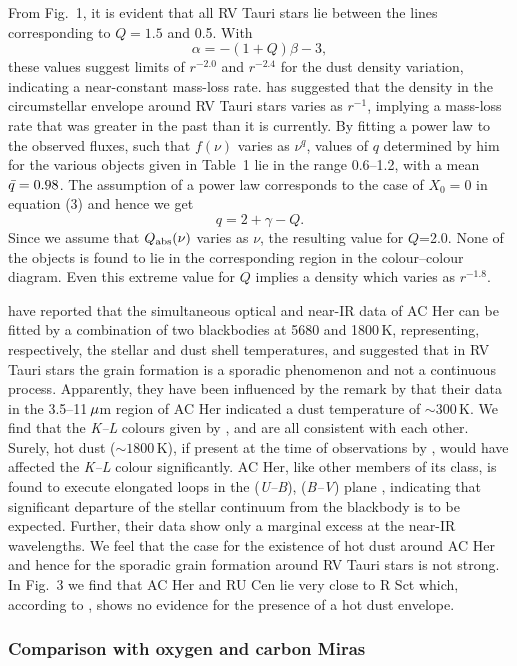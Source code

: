 \documentclass[useAMS,usenatbib]{mn2e}
\begin{document}
From Fig.~1, it is evident that all RV Tauri stars lie between the
lines corresponding to $Q=1.5$ and 0.5. With
 \[
  \alpha=-(1+Q)\beta-3,
 \]
 these values suggest limits of $r^{-2.0}$ and $r^{-2.4}$ for the
dust density variation, indicating a near-constant mass-loss rate.
\citet{b12} has suggested that the density in the circumstellar
envelope around RV Tauri stars varies as $r^{-1}$, implying a
mass-loss rate that was greater in the past than it is currently.
By fitting a power law to the observed fluxes, such that $f(\nu)$
varies as $\nu^q$, values of $q$ determined by him for the various
objects given in Table~1 lie in the range 0.6--1.2, with a mean
$\skew5\bar q=0.98$. The assumption of a power law corresponds to
the case of $X_0=0$ in equation (3) and hence we get
 \[
  q=2+\gamma -Q.
 \]
Since we assume that $Q_{{\mathrm{abs}}}(\nu)$ varies as $\nu$, the
resulting value for $Q$=2.0. None of the objects is found to lie in the
corresponding region in the colour--colour diagram. Even this extreme
value for $Q$ implies a density which varies as $r^{-1.8}$.

\citet{b9} have reported that the simultaneous optical and near-IR
data of AC Her can be fitted by a combination of two blackbodies
at 5680 and 1800\,K, representing, respectively, the stellar and
dust shell temperatures, and suggested that in RV Tauri stars the
grain formation is a sporadic phenomenon and not a continuous
process. Apparently, they have been influenced by the remark by
\citet{b7} that their data in the 3.5--11$\,\mu$m region of AC
Her indicated a dust temperature of $\sim$300\,K. We find that the
{\it K--L\/} colours given by \citet{b5}, \citet{b15} and
\citet{b9} are all consistent with each other. Surely, hot dust
($\sim 1800\,$K), if present at the time of observations by
\citet{b9}, would have affected the {\it K--L\/} colour
significantly. AC Her, like other members of its class, is found
to execute elongated loops in the ({\it U--B\/}), ({\it B--V\/})
plane \citep{b20}, indicating that significant departure of the
stellar continuum from the blackbody is to be expected. Further,
their data show only a marginal excess at the near-IR wavelengths.
We feel that the case for the existence of hot dust around AC Her
and hence for the sporadic grain formation around RV Tauri stars
is not strong. In Fig.~3 we find that AC Her and RU Cen lie very
close to R Sct which, according to \citet{b9}, shows no evidence
for the presence of a hot dust envelope.

\subsubsection{Comparison with oxygen and carbon Miras}
\end{document}
